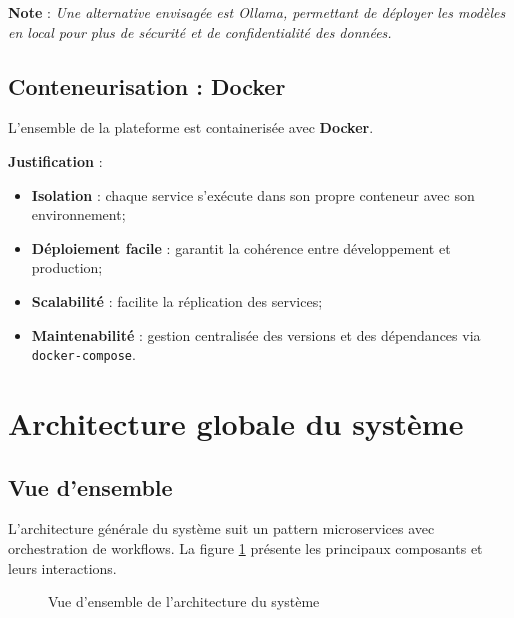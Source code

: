 \textbf{Note} : \textit{Une alternative envisagée est Ollama, permettant de déployer les modèles en local pour plus de sécurité et de confidentialité des données.}


\subsection{Conteneurisation : Docker}
\label{subsec:containerisation-docker}

L'ensemble de la plateforme est containerisée avec \textbf{Docker}.

\textbf{Justification} :

\begin{itemize}
    \item \textbf{Isolation} : chaque service s'exécute dans son propre conteneur avec son environnement;
    
    \item \textbf{Déploiement facile} : garantit la cohérence entre développement et production;
    
    \item \textbf{Scalabilité} : facilite la réplication des services;
    
    \item \textbf{Maintenabilité} : gestion centralisée des versions et des dépendances via \texttt{docker-compose}.
\end{itemize}


\section{Architecture globale du système}
\label{sec:architecture-globale}

\subsection{Vue d'ensemble}
\label{subsec:vue-ensemble}

L'architecture générale du système suit un pattern microservices avec orchestration de workflows. La figure \ref{fig:architecture-overview} présente les principaux composants et leurs interactions.

\begin{figure}[!ht]
    \centering
    \caption{Vue d'ensemble de l'architecture du système}
    \label{fig:architecture-overview}
\end{figure}

